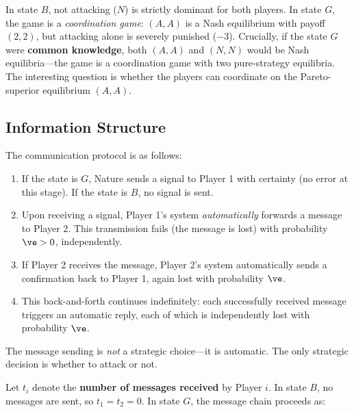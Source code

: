 In state $B$, not attacking ($N$) is strictly dominant for both players. In state $G$, the game is a \textit{coordination game}: $(A, A)$ is a Nash equilibrium with payoff $(2,2)$, but attacking alone is severely punished ($-3$). Crucially, if the state $G$ were \textbf{common knowledge}, both $(A, A)$ and $(N, N)$ would be Nash equilibria---the game is a coordination game with two pure-strategy equilibria. The interesting question is whether the players can coordinate on the Pareto-superior equilibrium $(A, A)$.

\subsection{Information Structure}

The communication protocol is as follows:
\begin{enumerate}
  \item If the state is $G$, Nature sends a signal to Player 1 with certainty (no error at this stage). If the state is $B$, no signal is sent.
  \item Upon receiving a signal, Player 1's system \textit{automatically} forwards a message to Player 2. This transmission fails (the message is lost) with probability $\ve > 0$, independently.
  \item If Player 2 receives the message, Player 2's system automatically sends a confirmation back to Player 1, again lost with probability $\ve$.
  \item This back-and-forth continues indefinitely: each successfully received message triggers an automatic reply, each of which is independently lost with probability $\ve$.
\end{enumerate}
The message sending is \textit{not} a strategic choice---it is automatic. The only strategic decision is whether to attack or not.

Let $t_i$ denote the \textbf{number of messages received} by Player $i$. In state $B$, no messages are sent, so $t_1 = t_2 = 0$. In state $G$, the message chain proceeds as:
\begin{center}
\end{center}


